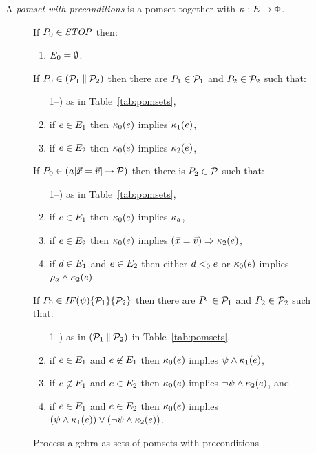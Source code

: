 \begin{definition}
  A \emph{pomset with preconditions} is
  a pomset together with $\kappa:E\mathbin\rightarrow\Phi$.
\end{definition}

\begin{figure*}
  If $P_0\in\mathit{STOP}$ then:
  \begin{enumerate}
  \item $E_0 = \emptyset$.
  \end{enumerate}
  If $P_0 \in (\mathcal{P}_1\mathbin{\parallel}\mathcal{P}_2)$ then
  there are $P_1\in\mathcal{P}_1$ and $P_2\in\mathcal{P}_2$ such that:
  \begin{enumerate}
     \setcounter{enumi}{\value{pomsetParCount}}
  \item[1--\thepomsetParCount)] as in Table~\ref{tab:pomsets},
  \item if $e\in E_1$ then $\kappa_0(e)$ implies $\kappa_1(e)$,
  \item if $e\in E_2$ then $\kappa_0(e)$ implies $\kappa_2(e)$,
    \setcounter{pomsetPreParCount}{\value{enumi}}
  \end{enumerate}
  If $\aPS_0 \in (\aAct[\vec\aVar=\vec\aVal]\wPREFIX\aPSS)$ then there is $P_2\in\mathcal{P}$ such that:
  \begin{enumerate}
     \setcounter{enumi}{\value{pomsetPrefixCount}}
  \item[1--\thepomsetPrefixCount)] as in Table~\ref{tab:pomsets},
  \item if $e\in E_1$ then $\kappa_0(e)$ implies $\kappa_a$,
  \item if $e\in E_2$ then $\kappa_0(e)$ implies $(\vec{x}=\vec{v}) \Rightarrow \kappa_2(e)$,
  \item if $d\in E_1$ and $e\in E_2$ then either $d<_0e$ or 
    $\kappa_0(e)$ implies $\rho_a\land\kappa_2(e)$.
  \end{enumerate}
  If $P_0 \in \mathit{IF}({\psi})\{\mathcal{P}_1\}\{\mathcal{P}_2\}$ then
  there are $P_1\in\mathcal{P}_1$ and $P_2\in\mathcal{P}_2$ such that:
  \begin{enumerate}
  \setcounter{enumi}{\value{pomsetwParCount}}
  \item[1--\thepomsetwParCount)] as in $(\mathcal{P}_1\mathbin{\parallel}\mathcal{P}_2)$  in Table~\ref{tab:pomsets},
  \item if $e\in E_1$ and $e\not\in E_1$ then $\kappa_0(e)$ implies $\psi\land\kappa_1(e)$,
  \item if $e\not\in E_1$ and $e\in E_2$ then $\kappa_0(e)$ implies $\neg\psi\land\kappa_2(e)$, and
  \item if $e\in E_1$ and $e\in E_2$ then $\kappa_0(e)$ implies $(\psi\land\kappa_1(e))\lor(\neg\psi\land\kappa_2(e))$.
    \setcounter{pomsetPreIfCount}{\value{enumi}}
  \end{enumerate}
\caption{Process algebra as sets of pomsets with preconditions}
\label{tab:pomsets-pre}
\end{figure*}

